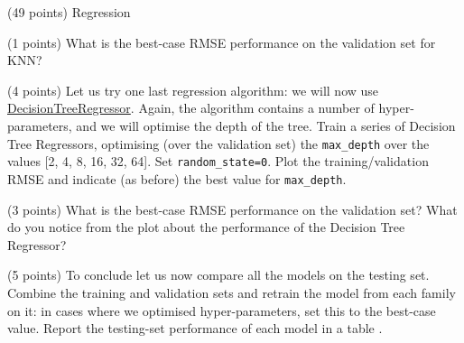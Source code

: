 \documentclass[12pt]{article}
\begin{document}
\begin{question}{\label{Q_LR_BA}(49 points) Regression}
\begin{subquestion}{(1 points) What is the best-case RMSE performance on the validation set for KNN?}






\end{subquestion}

\begin{subquestion}{(4 points) Let us try one last regression algorithm: we will now use \href{https://scikit-learn.org/stable/modules/generated/sklearn.tree.DecisionTreeRegressor.html}{DecisionTreeRegressor}. Again, the algorithm contains a number of hyper-parameters, and we will optimise the depth of the tree. Train a series of Decision Tree Regressors, optimising (over the validation set) the \texttt{max\_depth} over the values [2, 4, 8, 16, 32, 64]. Set \texttt{random\_state=0}. Plot the training/validation RMSE and indicate (as before) the best value for \texttt{max\_depth}.}






\end{subquestion}

\begin{subquestion}{(3 points) What is the best-case RMSE performance on the validation set? What do you notice from the plot about the performance of the Decision Tree Regressor?}






\end{subquestion}

\begin{subquestion}{(5 points) To conclude let us now compare all the models on the testing set. Combine the training and validation sets and retrain the model from each family on it: in cases where we optimised hyper-parameters, set this to the best-case value. Report the testing-set performance of each model in a table .}






\end{subquestion}

\end{question}

\end{document}

